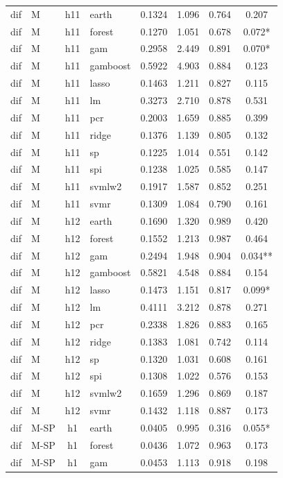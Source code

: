 \begin{ThreePartTable}
\begin{longtable}[t]{llclcccc}
\addlinespace
dif & M & h11 & earth & 0.1324 & 1.096 & 0.764 & 0.207\\
dif & M & h11 & forest & 0.1270 & 1.051 & 0.678 & 0.072*\\
dif & M & h11 & gam & 0.2958 & 2.449 & 0.891 & 0.070*\\
dif & M & h11 & gamboost & 0.5922 & 4.903 & 0.884 & 0.123\\
dif & M & h11 & lasso & 0.1463 & 1.211 & 0.827 & 0.115\\
dif & M & h11 & lm & 0.3273 & 2.710 & 0.878 & 0.531\\
dif & M & h11 & pcr & 0.2003 & 1.659 & 0.885 & 0.399\\
dif & M & h11 & ridge & 0.1376 & 1.139 & 0.805 & 0.132\\
dif & M & h11 & sp & 0.1225 & 1.014 & 0.551 & 0.142\\
dif & M & h11 & spi & 0.1238 & 1.025 & 0.585 & 0.147\\
dif & M & h11 & svmlw2 & 0.1917 & 1.587 & 0.852 & 0.251\\
dif & M & h11 & svmr & 0.1309 & 1.084 & 0.790 & 0.161\\
\addlinespace
dif & M & h12 & earth & 0.1690 & 1.320 & 0.989 & 0.420\\
dif & M & h12 & forest & 0.1552 & 1.213 & 0.987 & 0.464\\
dif & M & h12 & gam & 0.2494 & 1.948 & 0.904 & 0.034**\\
dif & M & h12 & gamboost & 0.5821 & 4.548 & 0.884 & 0.154\\
dif & M & h12 & lasso & 0.1473 & 1.151 & 0.817 & 0.099*\\
dif & M & h12 & lm & 0.4111 & 3.212 & 0.878 & 0.271\\
dif & M & h12 & pcr & 0.2338 & 1.826 & 0.883 & 0.165\\
dif & M & h12 & ridge & 0.1383 & 1.081 & 0.742 & 0.114\\
dif & M & h12 & sp & 0.1320 & 1.031 & 0.608 & 0.161\\
dif & M & h12 & spi & 0.1308 & 1.022 & 0.576 & 0.153\\
dif & M & h12 & svmlw2 & 0.1659 & 1.296 & 0.869 & 0.187\\
dif & M & h12 & svmr & 0.1432 & 1.118 & 0.887 & 0.173\\
\addlinespace
dif & M-SP & h1 & earth & 0.0405 & 0.995 & 0.316 & 0.055*\\
dif & M-SP & h1 & forest & 0.0436 & 1.072 & 0.963 & 0.173\\
dif & M-SP & h1 & gam & 0.0453 & 1.113 & 0.918 & 0.198\\

\end{longtable}
\end{ThreePartTable}
